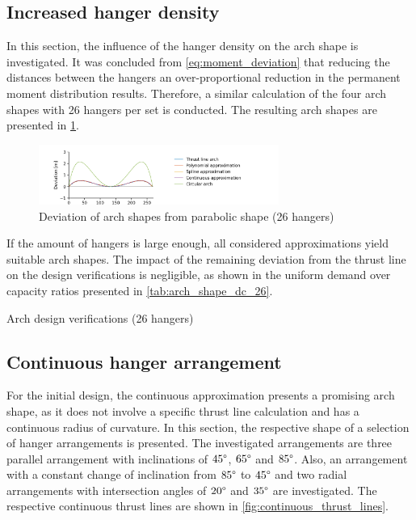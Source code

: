 \subsection{Increased hanger density} \label{sec:arch_shape_increased}
In this section, the influence of the hanger density on the arch shape is investigated. It was concluded from \cref{eq:moment_deviation} that reducing the distances between the hangers an over-proportional reduction in the permanent moment distribution results. Therefore, a similar calculation of the four arch shapes with 26 hangers per set is conducted. The resulting arch shapes are presented in \cref{fig:arch_shapes_26}.

\begin{figure}[H]
    \centering
    \includegraphics[trim={1cm 0 3cm 0.48cm},clip, width=0.7\textwidth]{calculations/arch shape/arch_shapes_26.png}
    \caption{Deviation of arch shapes from parabolic shape (26 hangers)}
    \label{fig:arch_shapes_26}
\end{figure}

If the amount of hangers is large enough, all considered approximations yield suitable arch shapes. The impact of the remaining deviation from the thrust line on the design verifications is negligible, as shown in the uniform demand over capacity ratios presented in \cref{tab:arch_shape_dc_26}.

\begin{table}[H]
    \centering
    \caption{Arch design verifications (26 hangers)}
    \label{tab:arch_shape_dc_26}
    
\end{table}

\subsection{Continuous hanger arrangement} \label{sec:arch_shape_continuous}
For the initial design, the continuous approximation presents a promising arch shape, as it does not involve a specific thrust line calculation and has a continuous radius of curvature. In this section, the respective shape of a selection of hanger arrangements is presented. The investigated arrangements are three parallel arrangement with inclinations of $45\degree$, $65\degree$ and $85\degree$. Also, an arrangement with a constant change of inclination from $85\degree$ to $45\degree$ and two radial arrangements with intersection angles of $20\degree$ and $35\degree$ are investigated. The respective continuous thrust lines are shown in \cref{fig:continuous_thrust_lines}.

